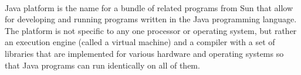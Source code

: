 \paragraph{}
Java platform is the name for a bundle of related programs from Sun that allow for developing and running programs written in the Java programming language. The platform is not specific to any one processor or operating system, but rather an execution engine (called a virtual machine) and a compiler with a set of libraries that are implemented for various hardware and operating systems so that Java programs can run identically on all of them.